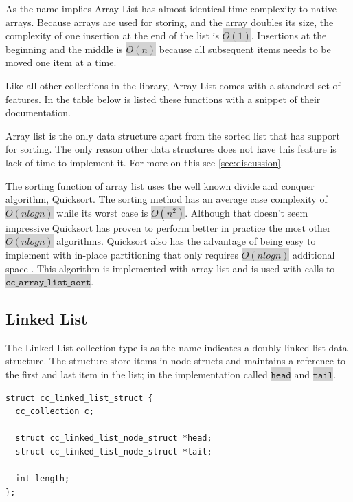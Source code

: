 \documentclass[table]{ituthesis}
\newcommand{\highlight}[1]{\colorbox{lightGray}{$\displaystyle \texttt{#1}$}}
\begin{document}
	As the name implies Array List has almost identical time complexity to native arrays. Because arrays are used for storing, and the array doubles its size, the complexity of one insertion at the end of the list is \highlight{$O(1)$}. Insertions at the beginning and the middle is \highlight{$O(n)$} because all subsequent items needs to be moved one item at a time.

	Like all other collections in the library, Array List comes with a standard set of features. In the table below is listed these functions with a snippet of their documentation.
	
	Array list is the only data structure apart from the sorted list that has support for sorting. The only reason other data structures does not have this feature is lack of time to implement it. For more on this see \autoref{sec:discussion}.

	The sorting function of array list uses the well known divide and conquer algorithm, Quicksort. The sorting method has an average case complexity of \highlight{$O(n log n)$} while its worst case is \highlight{$O(n^2)$}. Although that doesn't seem impressive Quicksort has proven to perform better in practice the most other \highlight{$O(n log n)$} algorithms. Quicksort also has the advantage of being easy to implement with in-place partitioning that only requires \highlight{$O(n log n)$} additional space \cite[p. 145]{Algorithms2002}. This algorithm is implemented with array list and is used with calls to \highlight{cc\_array\_list\_sort}.
	
	\subsection{Linked List}\label{sec:linked_list}
	
	The Linked List collection type is as the name indicates a doubly-linked list data structure. The structure store items in node structs and maintains a reference to the first and last item in the list; in the implementation called \highlight{head} and \highlight{tail}.

\begin{lstlisting}[label=cc_linked_list-struct,caption=Internal representation of Linked List]
struct cc_linked_list_struct {
  cc_collection c;

  struct cc_linked_list_node_struct *head;
  struct cc_linked_list_node_struct *tail;

  int length;
};
\end{lstlisting}
\end{document}
